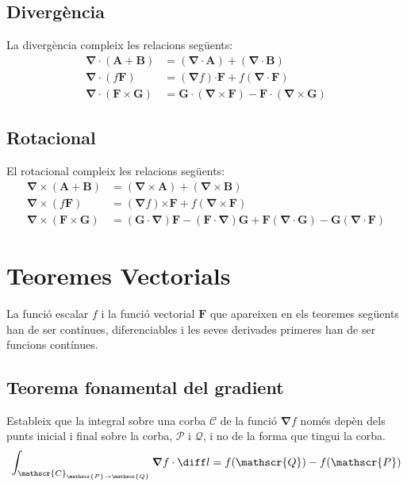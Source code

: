 \documentclass[catalan,a4paper,twoside,11pt]{article}
\begin{document}
\subsection{Divergència}
La divergència compleix les relacions següents:
\begin{align}
    \boldsymbol{\nabla\cdot}(\boldsymbol{A}+\boldsymbol{B}) &= (\boldsymbol{\nabla\cdot A}) +
    (\boldsymbol{\nabla\cdot B})\\
    \boldsymbol{\nabla\cdot}(f\boldsymbol{F}) &=
    (\boldsymbol{\nabla}f)\boldsymbol{\cdot F} + f(\boldsymbol{\nabla\cdot F})\\
       \boldsymbol{\nabla\cdot}(\boldsymbol{F\times G}) &=
    \boldsymbol{G\cdot}(\boldsymbol{\nabla\times F}) -
    \boldsymbol{F\cdot}(\boldsymbol{\nabla\times G})
\end{align}

\subsection{Rotacional}
El rotacional compleix les relacions següents:
\begin{align}
    \boldsymbol{\nabla\times}(\boldsymbol{A}+\boldsymbol{B}) &= (\boldsymbol{\nabla\times A}) + (\boldsymbol{\nabla\times B})\\
    \boldsymbol{\nabla\times}(f\boldsymbol{F}) &=
    (\boldsymbol{\nabla}f)\boldsymbol{\times F} + f(\boldsymbol{\nabla\times F})\\
    \boldsymbol{\nabla\times}(\boldsymbol{F\times G}) &= (\boldsymbol{G\cdot\nabla})\boldsymbol{F} - (\boldsymbol{F\cdot\nabla})\boldsymbol{G} + \boldsymbol{F}(\boldsymbol{\nabla\cdot G}) - \boldsymbol{G}(\boldsymbol{\nabla\cdot F})
\end{align}


\section{Teoremes Vectorials}

La funció escalar $f$ i la funció vectorial $\boldsymbol{F}$ que apareixen en els teoremes següents han de ser contínues, diferenciables i les seves derivades primeres han de ser funcions contínues.

\subsection{Teorema fonamental del gradient}
Estableix que la integral sobre una corba $\mathscr{C}$ de la funció $\boldsymbol{\nabla} f$ només depèn dels punts inicial i final sobre la corba, $\mathscr{P}$ i $\mathscr{Q}$, i no de la forma que tingui la corba.
\begin{equation}
    \int_{\mathscr{C}_{\mathscr{P}\rightarrow \mathscr{Q}}} \boldsymbol{\nabla}f \cdot \diff l = f(\mathscr{Q})-f(\mathscr{P})
\end{equation}
\end{document}
